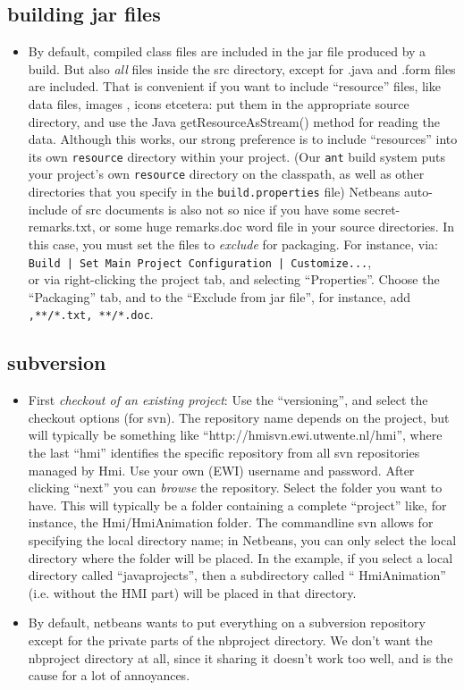 \subsection{ building jar files}
\begin{itemize}
\item By default, compiled class files are included in the jar file
produced by a build. But also \emph{all} files inside the src directory, except for
.java and .form files are included. That is convenient if you want to include ``resource'' files,
like data files, images , icons etcetera: put them in the appropriate source directory, and
use the Java getResourceAsStream() method for reading the data.
Although this works, our strong preference is to include ``resources'' into its own \verb#resource# directory within
your project. (Our \verb#ant# build system puts your project's own \verb#resource# directory on the classpath, as well as
other directories that you specify in the \verb#build.properties# file)
Netbeans auto-include of src documents is also not so nice if you have some secret-remarks.txt, or some huge remarks.doc
word file in your source directories. In this case, you must set the files to \emph{exclude}
for packaging. For instance, via:\\
\verb#Build | Set Main Project Configuration | Customize...#,\\
or via right-clicking the project tab, and selecting ``Properties''.
Choose the ``Packaging'' tab, and to the ``Exclude from jar file'', for instance,
add \verb#,**/*.txt, **/*.doc#.
\end{itemize}

\subsection{subversion}
\begin{itemize}
\item First \emph{checkout of an existing project}: Use the ``versioning'', and select the checkout
options (for svn). The repository name depends on the project, but will typically be something
like ``http://hmisvn.ewi.utwente.nl/hmi'', where the last ``hmi'' identifies the specific repository
from all svn repositories managed by Hmi. Use your own (EWI) username and password.
After clicking ``next'' you can \emph{browse} the repository. Select the folder you want to have.
This will typically be a folder containing a complete ``project'' like, for instance,
the Hmi/HmiAnimation folder. The commandline svn allows for specifying the local directory name;
in Netbeans, you can only select the local directory where the folder will be placed.
In the example, if you select a local directory called ``javaprojects'', then a subdirectory called
`` HmiAnimation'' (i.e. without the HMI part) will be placed in that directory.
\item By default, netbeans wants to put everything on a subversion repository except for the private
parts of the nbproject directory. We don't want the nbproject directory at all, since it sharing
it doesn't work too well, and is the cause for a lot of annoyances.
\end{itemize}


